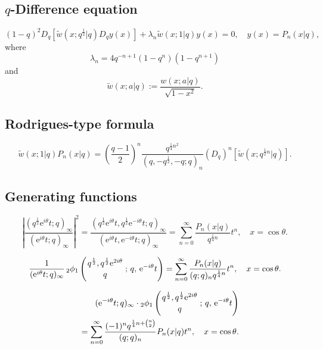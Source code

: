 \documentclass[envcountchap,graybox]{svmono}
\newcommand{\qhyp}[5]{\mbox{}_{#1}{\phi}_{#2}
\left(\genfrac{}{}{0pt}{}{#3}{#4}\,;\,q,\,#5\right)}
\newcommand{\e}{\textrm{e}}
\begin{document}
\subsection*{$q$-Difference equation}
\begin{equation}
\label{dvContqLegendre}
(1-q)^2D_q\left[{\tilde w}(x;q^{\frac{1}{2}}|q)D_qy(x)\right]+
\lambda_n{\tilde w}(x;1|q)y(x)=0,\quad y(x)=P_n(x|q),
\end{equation}
where
$$\lambda_n=4q^{-n+1}(1-q^n)(1-q^{n+1})$$
and
$${\tilde w}(x;a|q):=\frac{w(x;a|q)}{\sqrt{1-x^2}}.$$

\subsection*{Rodrigues-type formula}
\begin{equation}
\label{RodContqLegendre}
{\tilde w}(x;1|q)P_n(x|q)=\left(\frac{q-1}{2}\right)^n
\frac{q^{\frac{1}{4}n^2}}{(q,-q^{\frac{1}{2}},-q;q)_n}
\left(D_q\right)^n\left[{\tilde w}(x;q^{\frac{1}{2}n}|q)\right].
\end{equation}

\subsection*{Generating functions}
\begin{equation}
\label{GenContqLegendre1}
\left|\frac{(q^{\frac{1}{2}}\e^{i\theta}t;q)_{\infty}}{(\e^{i\theta}t;q)_{\infty}}\right|^2
=\frac{(q^{\frac{1}{2}}\e^{i\theta}t,q^{\frac{1}{2}}\e^{-i\theta}t;q)_{\infty}}
{(\e^{i\theta}t,\e^{-i\theta}t;q)_{\infty}}
=\sum_{n=0}^{\infty}\frac{P_n(x|q)}{q^{\frac{1}{4}n}}t^n,\quad x=\cos\theta.
\end{equation}

\begin{equation}
\label{GenContqLegendre2}
\frac{1}{(\e^{i\theta}t;q)_{\infty}}\,
\qhyp{2}{1}{q^{\frac{1}{2}},q^{\frac{1}{2}}\e^{2i\theta}}{q}{\e^{-i\theta}t}
=\sum_{n=0}^{\infty}\frac{P_n(x|q)}{(q;q)_nq^{\frac{1}{4}n}}t^n,\quad x=\cos\theta.
\end{equation}

\begin{eqnarray}
\label{GenContqLegendre3}
& &(\e^{-i\theta}t;q)_{\infty}\cdot
\qhyp{2}{1}{q^{\frac{1}{2}},q^{\frac{1}{2}}\e^{2i\theta}}{q}{\e^{-i\theta}t}\nonumber\\
& &{}=\sum_{n=0}^{\infty}\frac{(-1)^nq^{\frac{1}{4}n+\binom{n}{2}}}{(q;q)_n}P_n(x|q)t^n,
\quad x=\cos\theta.
\end{eqnarray}
\end{document}
